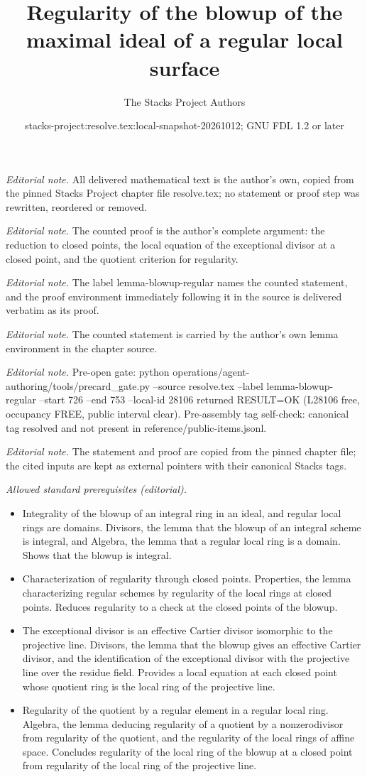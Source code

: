\documentclass[10pt,a4paper]{amsart}
\title{Regularity of the blowup of the maximal ideal of a regular local surface}
\author{The Stacks Project Authors}
\date{stacks-project:resolve.tex:local-snapshot-20261012; GNU FDL 1.2 or later}
\theoremstyle{plain}
\theoremstyle{definition}
\theoremstyle{remark}
\numberwithin{equation}{subsection}
\begin{document}
\maketitle
\noindent\textit{Editorial note.} All delivered mathematical text is the author's own, copied from the pinned Stacks Project chapter file resolve.tex; no statement or proof step was rewritten, reordered or removed.\par\medskip
\noindent\textit{Editorial note.} The counted proof is the author's complete argument: the reduction to closed points, the local equation of the exceptional divisor at a closed point, and the quotient criterion for regularity.\par\medskip
\noindent\textit{Editorial note.} The label lemma-blowup-regular names the counted statement, and the proof environment immediately following it in the source is delivered verbatim as its proof.\par\medskip
\noindent\textit{Editorial note.} The counted statement is carried by the author's own lemma environment in the chapter source.\par\medskip
\noindent\textit{Editorial note.} Pre-open gate: python operations/agent-authoring/tools/precard\_gate.py --source resolve.tex --label lemma-blowup-regular --start 726 --end 753 --local-id 28106 returned RESULT=OK (L28106 free, occupancy FREE, public interval clear). Pre-assembly tag self-check: canonical tag resolved and not present in reference/public-items.jsonl.\par\medskip
\noindent\textit{Editorial note.} The statement and proof are copied from the pinned chapter file; the cited inputs are kept as external pointers with their canonical Stacks tags.\par\medskip
\noindent\textit{Allowed standard prerequisites (editorial).}\begin{itemize}
\item Integrality of the blowup of an integral ring in an ideal, and regular local rings are domains. Divisors, the lemma that the blowup of an integral scheme is integral, and Algebra, the lemma that a regular local ring is a domain. Shows that the blowup is integral.
\item Characterization of regularity through closed points. Properties, the lemma characterizing regular schemes by regularity of the local rings at closed points. Reduces regularity to a check at the closed points of the blowup.
\item The exceptional divisor is an effective Cartier divisor isomorphic to the projective line. Divisors, the lemma that the blowup gives an effective Cartier divisor, and the identification of the exceptional divisor with the projective line over the residue field. Provides a local equation at each closed point whose quotient ring is the local ring of the projective line.
\item Regularity of the quotient by a regular element in a regular local ring. Algebra, the lemma deducing regularity of a quotient by a nonzerodivisor from regularity of the quotient, and the regularity of the local rings of affine space. Concludes regularity of the local ring of the blowup at a closed point from regularity of the local ring of the projective line.
\end{itemize}\medskip
\end{document}

